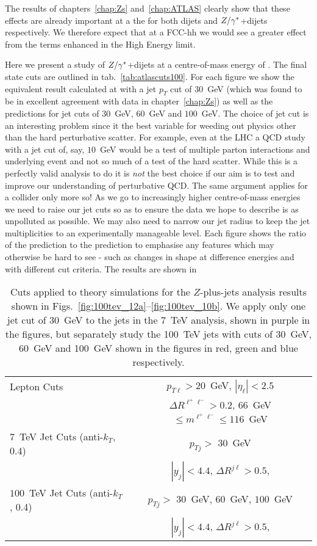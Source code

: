 	The results of chapters~\ref{chap:Zs} and~\ref{chap:ATLAS} clearly show that these effects are already important
	at a the \stev for both dijets and $Z/\gamma^*$+dijets respectively.  We therefore expect that at a \htev FCC-hh we would
	see a greater effect from the terms enhanced in the High Energy limit.

	Here we present a study of $Z/\gamma^*$+dijets at a centre-of-mass energy of \htev.  The final state cuts
	are outlined in tab.~\eqref{tab:atlascuts100}.  For each figure we show the equivalent result calculated
	at \stev with a jet $p_T$ cut of $30$~GeV (which was found to be in excellent agreement with data in chapter~\ref{chap:Zs}) as
	well as the \htev predictions for jet cuts of $30$~GeV, $60$~GeV and $100$~GeV.  The choice of jet cut
	is an interesting problem since it the best variable for weeding out physics other than the hard
	perturbative scatter.  For example, even at the \stev LHC a QCD study with a jet cut of, say,
	$10$~GeV would be a test of multiple parton interactions and underlying event and not so much of a test
	of the hard scatter.  While this is a perfectly valid analysis to do it is \emph{not} the best choice if our aim is to test and
	improve our understanding of perturbative QCD.  The same argument applies for a \htev collider
	only more so!  As we go to increasingly higher centre-of-mass energies we need to raise our
	jet cuts so as to ensure the data we hope to describe is as unpolluted as possible.  We may also need to
	narrow our jet radius to keep the jet multiplicities to an experimentally manageable level.  Each figure
	shows the ratio of the \htev prediction to the \stev prediction to emphasise any features
	which may otherwise be hard to see - such as changes in shape at difference energies and with different cut criteria.  The \stev results are shown in

	\begin{table}[bth]
	  \centering
	  \begin{tabular}{|l|c|}
	    \hline
	    Lepton Cuts & $p_{T\ell}>20$~GeV, \; $|\eta_\ell|<2.5$ \\
	    & $\Delta R^{\ell^+\ell^-} > 0.2$, \; $66$~GeV $\leq m^{\ell^+\ell^-} \leq
	      116$~GeV \\ \hline
	    $7$~TeV Jet Cuts (anti-$k_T$, 0.4) & $p_{Tj}>$ $30$~GeV \\
	    &  $|y_j|<4.4$, \;$\Delta R^{j\ell} >0.5$,  \\ \hline
	    $100$~TeV Jet Cuts (anti-$k_T$, 0.4) & $p_{Tj}>$ $30$~GeV, $60$~GeV, $100$~GeV \\
	    &  $|y_j|<4.4$, \;$\Delta R^{j\ell} >0.5$,  \\ \hline
	  \end{tabular}
	  \caption{Cuts applied to theory simulations for the \htev
	    $Z$-plus-jets analysis results shown in Figs.~\eqref{fig:100tev_12a}--\eqref{fig:100tev_10b}.  We apply only one
	    jet cut of 30~GeV to the jets in the 7~TeV analysis, shown in purple in the figures, but separately study
	    the 100~TeV jets with cuts of 30~GeV, 60~GeV and 100~GeV shown in the figures in red, green and blue respectively.}
	  \label{tab:atlascuts100}
	\end{table}

